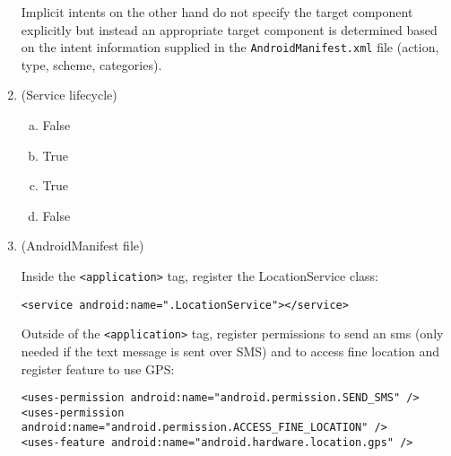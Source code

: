 \documentclass[11pt]{article}
\begin{document}
\begin{enumerate}
Implicit intents on the other hand do not specify the target component explicitly but instead an appropriate target component is determined based on the intent information supplied in the \lstinline{AndroidManifest.xml} file (action, type, scheme, categories).

\item (Service lifecycle)

\begin{enumerate}[a)]
\item False
\item True
\item True
\item False

\end{enumerate}

\item (AndroidManifest file)

Inside the \lstinline{<application>} tag, register the LocationService class:
\begin{lstlisting}
<service android:name=".LocationService"></service>
\end{lstlisting}

Outside of the \lstinline{<application>} tag, register permissions to send an sms (only needed if the text message is sent over SMS) and to access fine location and register feature to use GPS:
\begin{lstlisting}
<uses-permission android:name="android.permission.SEND_SMS" />
<uses-permission android:name="android.permission.ACCESS_FINE_LOCATION" />
<uses-feature android:name="android.hardware.location.gps" />
\end{lstlisting}

\end{enumerate}
\end{document}
